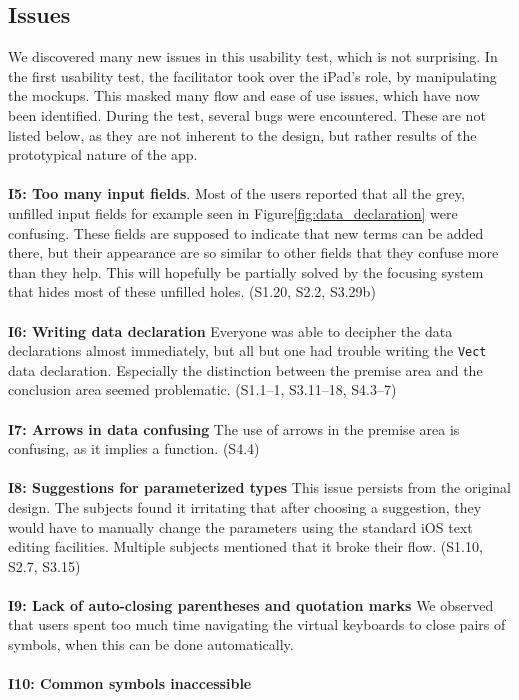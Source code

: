 \subsection{Issues}
\label{sec:second_issues}
We discovered many new issues in this usability test, which is not
surprising. In the first usability test, the facilitator took over the iPad's role, by
manipulating the mockups. This masked many flow and ease of use issues, which
have now been identified. During the test, several bugs were encountered. These
are not listed below, as they are not inherent to the design, but rather
results of the prototypical nature of the app.
\\ \\
\textbf{I5: Too many input fields}.
Most of the users reported that all the grey, unfilled input fields for example seen in Figure\ref{fig:data_declaration} were
confusing. These fields are supposed to indicate that new terms can be added
there, but their appearance are so similar to other fields that they confuse
more than they help.
This will hopefully be partially solved by the focusing system that hides most of these unfilled holes. (S1.20, S2.2, S3.29b)
\\ \\
\textbf{I6: Writing data declaration}
Everyone was able to decipher the data declarations almost immediately, but
all but one had trouble writing the \texttt{Vect} data declaration. Especially
the distinction between the premise area and the conclusion area seemed
problematic. (S1.1--1, S3.11--18, S4.3--7)
\\ \\
\textbf{I7: Arrows in data confusing}
The use of arrows in the premise area is confusing, as it implies a function. 
(S4.4)
\\ \\
\textbf{I8: Suggestions for parameterized types}
This issue persists from the original design. The subjects found it irritating
that after choosing a suggestion, they would have to manually change the
parameters using the standard iOS text editing facilities. Multiple subjects
mentioned that it broke their flow. (S1.10, S2.7, S3.15)
\\ \\
\textbf{I9: Lack of auto-closing parentheses and quotation marks}
We observed that users spent too much time navigating the virtual keyboards to
close pairs of symbols, when this can be done automatically.
\\ \\
\textbf{I10: Common symbols inaccessible}
